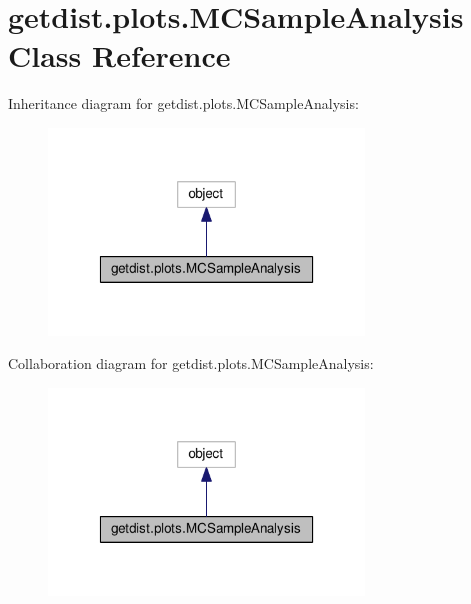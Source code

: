 \hypertarget{classgetdist_1_1plots_1_1MCSampleAnalysis}{}\section{getdist.\+plots.\+M\+C\+Sample\+Analysis Class Reference}
\label{classgetdist_1_1plots_1_1MCSampleAnalysis}


Inheritance diagram for getdist.\+plots.\+M\+C\+Sample\+Analysis\+:
\nopagebreak
\begin{figure}[H]
\begin{center}
\leavevmode
\includegraphics[width=238pt]{classgetdist_1_1plots_1_1MCSampleAnalysis__inherit__graph}
\end{center}
\end{figure}


Collaboration diagram for getdist.\+plots.\+M\+C\+Sample\+Analysis\+:
\nopagebreak
\begin{figure}[H]
\begin{center}
\leavevmode
\includegraphics[width=238pt]{classgetdist_1_1plots_1_1MCSampleAnalysis__coll__graph}
\end{center}
\end{figure}
